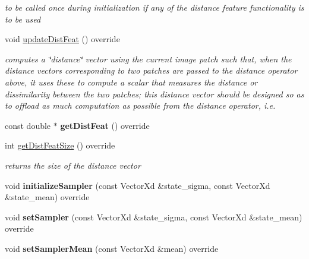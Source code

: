 \begin{DoxyCompactItemize}
\begin{DoxyCompactList}\small\item\em to be called once during initialization if any of the distance feature functionality is to be used \end{DoxyCompactList}\item 
void \hyperlink{classSSDBase_a85c8606b4d61ba1c775805e59641fc17}{update\-Dist\-Feat} () override
\begin{DoxyCompactList}\small\item\em computes a \char`\"{}distance\char`\"{} vector using the current image patch such that, when the distance vectors corresponding to two patches are passed to the distance operator above, it uses these to compute a scalar that measures the distance or dissimilarity between the two patches; this distance vector should be designed so as to offload as much computation as possible from the distance operator, i.\-e. \end{DoxyCompactList}\item 
\hypertarget{classSSDBase_aff550dc162648485439bc724acd872e0}{const double $\ast$ {\bfseries get\-Dist\-Feat} () override}\label{classSSDBase_aff550dc162648485439bc724acd872e0}

\item 
\hypertarget{classSSDBase_a7f86d10f4e21ed241b5833a5a0b1ab1d}{int \hyperlink{classSSDBase_a7f86d10f4e21ed241b5833a5a0b1ab1d}{get\-Dist\-Feat\-Size} () override}\label{classSSDBase_a7f86d10f4e21ed241b5833a5a0b1ab1d}

\begin{DoxyCompactList}\small\item\em returns the size of the distance vector \end{DoxyCompactList}\item 
\hypertarget{classSSDBase_ad520b0911b9e895bb44af6463dcc9774}{void {\bfseries initialize\-Sampler} (const Vector\-Xd \&state\-\_\-sigma, const Vector\-Xd \&state\-\_\-mean) override}\label{classSSDBase_ad520b0911b9e895bb44af6463dcc9774}

\item 
\hypertarget{classSSDBase_a5bbb849e1eafaf12a467bb968691685a}{void {\bfseries set\-Sampler} (const Vector\-Xd \&state\-\_\-sigma, const Vector\-Xd \&state\-\_\-mean) override}\label{classSSDBase_a5bbb849e1eafaf12a467bb968691685a}

\item 
\hypertarget{classSSDBase_aff42068765aeffedc3b17d81846b2a73}{void {\bfseries set\-Sampler\-Mean} (const Vector\-Xd \&mean) override}\label{classSSDBase_aff42068765aeffedc3b17d81846b2a73}


\end{DoxyCompactItemize}
